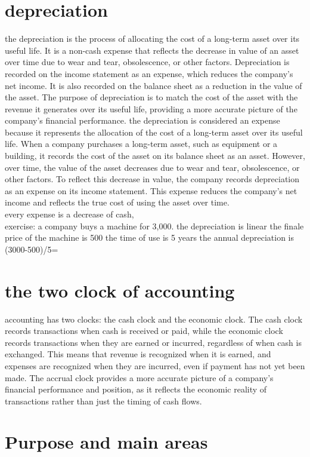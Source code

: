 \documentclass[12pt,a4paper]{report}
\begin{document}
\section{depreciation}
the depreciation is the process of allocating the cost of a long-term asset over its useful life. It is a non-cash expense that reflects the decrease in value of an asset over time due to wear and tear, obsolescence, or other factors. Depreciation is recorded on the income statement as an expense, which reduces the company's net income. It is also recorded on the balance sheet as a reduction in the value of the asset. The purpose of depreciation is to match the cost of the asset with the revenue it generates over its useful life, providing a more accurate picture of the company's financial performance.
the depreciation is considered an expense because it represents the allocation of the cost of a long-term asset over its useful life. When a company purchases a long-term asset, such as equipment or a building, it records the cost of the asset on its balance sheet as an asset. However, over time, the value of the asset decreases due to wear and tear, obsolescence, or other factors. To reflect this decrease in value, the company records depreciation as an expense on its income statement. This expense reduces the company's net income and reflects the true cost of using the asset over time.
\\every expense is a decrease of cash, 
\\exercise:
a company buys a machine for 3,000.
the depreciation is linear
the finale price of the machine is 500
the time of use is 5 years
the annual depreciation is (3000-500)/5=
\section{the two clock of accounting}
accounting has two clocks: the cash clock and the economic clock. The cash clock records transactions when cash is received or paid, while the economic clock records transactions when they are earned or incurred, regardless of when cash is exchanged. This means that revenue is recognized when it is earned, and expenses are recognized when they are incurred, even if payment has not yet been made. The accrual clock provides a more accurate picture of a company's financial performance and position, as it reflects the economic reality of transactions rather than just the timing of cash flows.

\section{Purpose and main areas}
\end{document}
